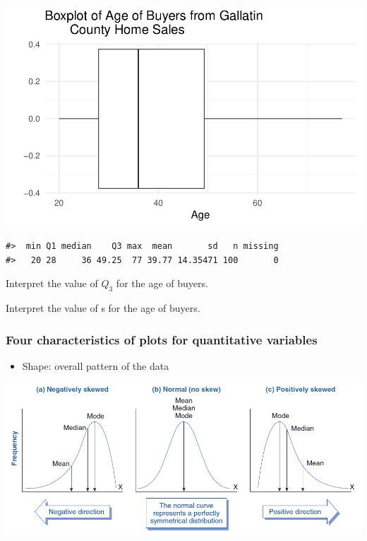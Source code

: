 \documentclass[
]{report}
\newenvironment{Shaded}{\begin{snugshade}}{\end{snugshade}}
\newcommand{\FunctionTok}[1]{\textcolor[rgb]{0.13,0.29,0.53}{\textbf{#1}}}
\newcommand{\NormalTok}[1]{#1}
\newcommand{\SpecialCharTok}[1]{\textcolor[rgb]{0.81,0.36,0.00}{\textbf{#1}}}
\providecommand{\tightlist}{%
  \setlength{\itemsep}{0pt}\setlength{\parskip}{0pt}}
\begin{document}
\begin{center}\includegraphics[width=0.7\linewidth]{06-VN06-EDAonemeanSim_files/figure-latex/unnamed-chunk-4-1} \end{center}

\begin{Shaded}
\end{Shaded}

\begin{verbatim}
#>  min Q1 median    Q3 max  mean       sd   n missing
#>   20 28     36 49.25  77 39.77 14.35471 100       0
\end{verbatim}

Interpret the value of \(Q_3\) for the age of buyers.

\vspace{0.5in}

Interpret the value of s for the age of buyers.

\vspace{0.5in}

\newpage

\subsubsection*{Four characteristics of plots for quantitative variables}\label{four-characteristics-of-plots-for-quantitative-variables}

\begin{itemize}
\tightlist
\item
  Shape: overall pattern of the data
\end{itemize}

\begin{center}\includegraphics[width=0.8\linewidth]{images/shape2} \end{center}
\end{document}
